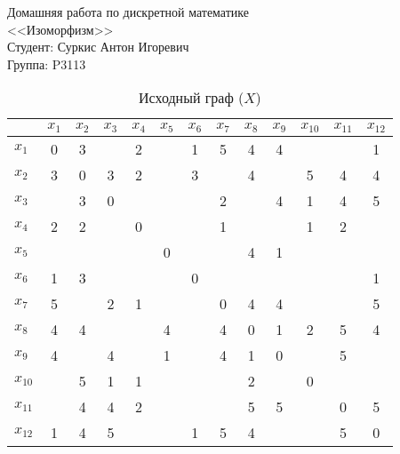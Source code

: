 \documentclass[a4paper,12pt]{article}
\begin{document}
    \pagestyle{fancy}
    \fancyfoot{}

    \noindent
    Домашняя работа по дискретной математике \\
    <<Изоморфизм>> \\
    Студент: Суркис Антон Игоревич \\
    Группа: P3113

    \begin{table}[H]
        \centering
        \caption{Исходный граф ($X$)}
        \begin{tabular}{l*{3}{|cccc}}
            &$x_{1}$&$x_{2}$&$x_{3}$&$x_{4}$&$x_{5}$&$x_{6}$&$x_{7}$&$x_{8}$&$x_{9}$&$x_{10}$&$x_{11}$&$x_{12}$\\
            \hline
            $x_{1}$&0&3&&2&&1&5&4&4&&&1\\
            $x_{2}$&3&0&3&2&&3&&4&&5&4&4\\
            $x_{3}$&&3&0&&&&2&&4&1&4&5\\
            $x_{4}$&2&2&&0&&&1&&&1&2&\\
            \hline
            $x_{5}$&&&&&0&&&4&1&&&\\
            $x_{6}$&1&3&&&&0&&&&&&1\\
            $x_{7}$&5&&2&1&&&0&4&4&&&5\\
            $x_{8}$&4&4&&&4&&4&0&1&2&5&4\\
            \hline
            $x_{9}$&4&&4&&1&&4&1&0&&5&\\
            $x_{10}$&&5&1&1&&&&2&&0&&\\
            $x_{11}$&&4&4&2&&&&5&5&&0&5\\
            $x_{12}$&1&4&5&&&1&5&4&&&5&0\\
        \end{tabular}
    \end{table}
\end{document}
